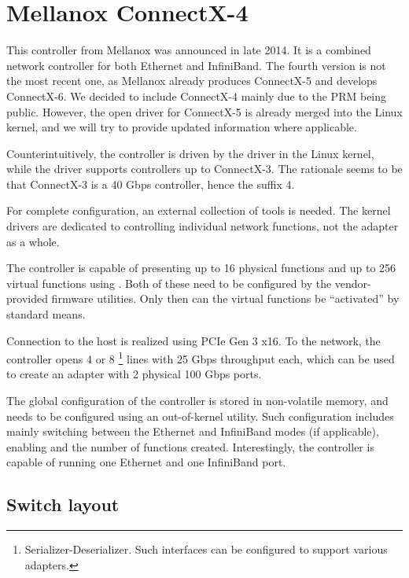 \section{Mellanox ConnectX-4}

This controller from Mellanox was announced in late 2014. It is a combined
network controller for both Ethernet and InfiniBand. The fourth version is not
the most recent one, as Mellanox already produces ConnectX-5 and develops
ConnectX-6. We decided to include ConnectX-4 mainly due to the
\acrfull{PRM} \cite{mlx-prm} being public. However, the open driver for
ConnectX-5 is already merged into the Linux kernel, and we will try to provide
updated information where applicable.

Counterintuitively, the controller is driven by the  driver in the
Linux kernel, while the  driver supports controllers up to ConnectX-3.
The rationale seems to be that ConnectX-3 is a 40 Gbps controller, hence the
suffix 4.

For complete configuration, an external collection of tools is needed. The
kernel drivers are dedicated to controlling individual network functions, not
the adapter as a whole.

The controller is capable of presenting up to 16 physical functions and up to
256 virtual functions using . Both of these need to be configured by
the vendor-provided firmware utilities. Only then can the virtual functions be
``activated'' by standard means.

Connection to the host is realized using PCIe Gen 3 x16. To the network, the
controller opens 4 or 8 \footnote{Serializer-Deserializer. Such
interfaces can be configured to support various  adapters.} lines with
25 Gbps throughput each, which
can be used to create an adapter with 2 physical 100 Gbps ports.

The global configuration of the controller is stored in non-volatile memory, and
needs to be configured using an out-of-kernel utility. Such configuration
includes mainly switching between the Ethernet and InfiniBand modes (if
applicable), enabling  and the number of functions created.
Interestingly, the controller is capable of running one Ethernet and one
InfiniBand port.

\subsection{Switch layout}

